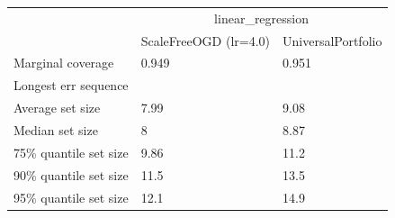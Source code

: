 \begin{tabular}{lll}
\toprule
& \multicolumn{2}{c}{linear_regression} \\
& ScaleFreeOGD (lr=4.0) & UniversalPortfolio \\
\midrule
Marginal coverage & 0.949 & 0.951 \\
Longest err sequence &  &  \\
Average set size & 7.99 & 9.08 \\
Median set size & 8 & 8.87 \\
75\% quantile set size & 9.86 & 11.2 \\
90\% quantile set size & 11.5 & 13.5 \\
95\% quantile set size & 12.1 & 14.9 \\
\bottomrule
\end{tabular}
